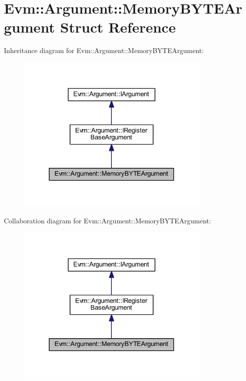 \hypertarget{struct_evm_1_1_argument_1_1_memory_b_y_t_e_argument}{}\section{Evm\+:\+:Argument\+:\+:Memory\+B\+Y\+T\+E\+Argument Struct Reference}
\label{struct_evm_1_1_argument_1_1_memory_b_y_t_e_argument}


Inheritance diagram for Evm\+:\+:Argument\+:\+:Memory\+B\+Y\+T\+E\+Argument\+:
\nopagebreak
\begin{figure}[H]
\begin{center}
\leavevmode
\includegraphics[width=272pt]{struct_evm_1_1_argument_1_1_memory_b_y_t_e_argument__inherit__graph}
\end{center}
\end{figure}


Collaboration diagram for Evm\+:\+:Argument\+:\+:Memory\+B\+Y\+T\+E\+Argument\+:
\nopagebreak
\begin{figure}[H]
\begin{center}
\leavevmode
\includegraphics[width=272pt]{struct_evm_1_1_argument_1_1_memory_b_y_t_e_argument__coll__graph}
\end{center}
\end{figure}
